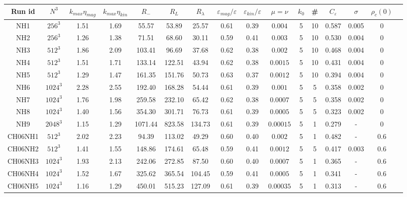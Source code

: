 \documentclass[aps,pre,onecolumn,superscriptaddress,notitlepage]{revtex4-1}
\newcommand{\Ceps}{C_\varepsilon}
\newcommand{\Rl}{R_{\lambda}}
\newcommand{\vep}{\varepsilon}
\begin{document}
 \begin{table}[]
 \begin{center}
 \begin{tabular}{cccccccccccccccc}
   Run id & $N^3$  & $k_{max}\eta_{mag}$ & $k_{max}\eta_{kin}$ & $R_{-}$ & $R_L$ & $\Rl$ & $\vep_{mag}/\vep$ & $\vep_{kin}/\vep$ & $\mu=\nu $  & $k_{0}$ & \#  & $\Ceps$
  & $\sigma$ & $\rho_c(0)$ \\
  \hline
  NH1 & $256^3$ & 1.51 & 1.69 & 55.57 & 53.89 & 25.57 & 0.61 & 0.39& $0.004$  & 5 & 10 & 0.587 &0.005 & 0 \\
  NH2 & $256^3$ & 1.26 & 1.38 & 71.51 & 68.60 & 30.11 & 0.59& 0.41& $0.003$ & 5 & 10 & 0.530 &0.004 & 0\\
  NH3 & $512^3$ & 1.86 & 2.09 & 103.41 & 96.69 & 37.68 & 0.62& 0.38& $0.002$  & 5 & 10 & 0.468 &0.004 & 0\\
  NH4 & $512^3$ & 1.51 & 1.71 & 133.14 & 122.51 & 43.94 & 0.62& 0.38& $0.0015$  & 5 & 10 & 0.431 &0.004 & 0\\
  NH5 & $512^3$ & 1.29 & 1.47 & 161.35 & 151.76 & 50.73 & 0.63& 0.37& $0.0012$  & 5 & 10 & 0.394 &0.004 & 0\\
  NH6 & $1024^3$ & 2.28 & 2.55 & 192.40 & 168.28 & 54.44 & 0.61& 0.39& $0.001$ & 5 & 5 & 0.358 & 0.002 & 0\\
  NH7 & $1024^3$ & 1.76 & 1.98 & 259.58 & 232.10 & 65.42 & 0.62& 0.38& $0.0007$ & 5 & 5 & 0.358 & 0.002 & 0 \\
  NH8 & $1024^3$ & 1.40 & 1.56 & 354.30 & 301.71 & 76.73 & 0.61& 0.39& $0.0005$  & 5 & 5 & 0.323 & 0.002 & 0\\
  NH9 & $2048^3$ & 1.15 & 1.29 & 1071.44 & 823.58 & 134.73 & 0.61& 0.39& $0.00015$  & 5 & 1 & 0.279 & - & 0\\
  \hline
  CH06NH1 & $512^3$ & 2.02 & 2.23 & 94.39 & 113.02 & 49.29 & 0.60 & 0.40 & $0.002$ & 5 & 1 & 0.482 & - & 0.6 \\
  CH06NH2 & $512^3$ & 1.41 & 1.55 & 148.86 & 174.61 & 65.48 & 0.59 & 0.41& $0.0012$ & 5 & 5 & 0.417  & 0.003 & 0.6 \\
  CH06NH3 & $1024^3$ & 1.93 & 2.13  & 242.06 & 272.85 & 87.50 & 0.60 & 0.40& $0.0007$ & 5 & 1 & 0.365 & - & 0.6 \\
  CH06NH4 & $1024^3$ & 1.52 & 1.67 & 325.62 & 365.54 & 104.45 & 0.59 & 0.41& $0.0005$ & 5 & 1 & 0.341  & - & 0.6 \\
  CH06NH5 & $1024^3$ & 1.16 & 1.29 & 450.01 & 515.23 & 127.09 & 0.61& 0.39& $0.00035$ & 5 & 1 & 0.313 & - & 0.6 \\
  \end{tabular}

\end{center}
\end{table}
\end{document}
